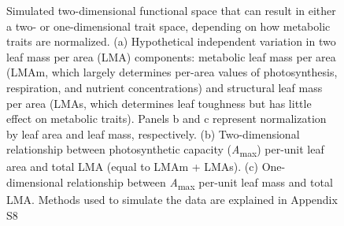 \documentclass[
  12pt,
  letterpaper,
  DIV=11,
  numbers=noendperiod]{scrartcl}
\begin{document}
\begin{figure}


\caption{\label{fig-hypo}Simulated two-dimensional functional space that
can result in either a two- or one-dimensional trait space, depending on
how metabolic traits are normalized. (a) Hypothetical independent
variation in two leaf mass per area (LMA) components: metabolic leaf
mass per area (LMAm, which largely determines per-area values of
photosynthesis, respiration, and nutrient concentrations) and structural
leaf mass per area (LMAs, which determines leaf toughness but has little
effect on metabolic traits). Panels b and c represent normalization by
leaf area and leaf mass, respectively. (b) Two-dimensional relationship
between photosynthetic capacity (\emph{A}\textsubscript{max}) per-unit
leaf area and total LMA (equal to LMAm + LMAs). (c) One-dimensional
relationship between \emph{A}\textsubscript{max} per-unit leaf mass and
total LMA. Methods used to simulate the data are explained in Appendix
S8}

\end{figure}%

\newpage
\end{document}
